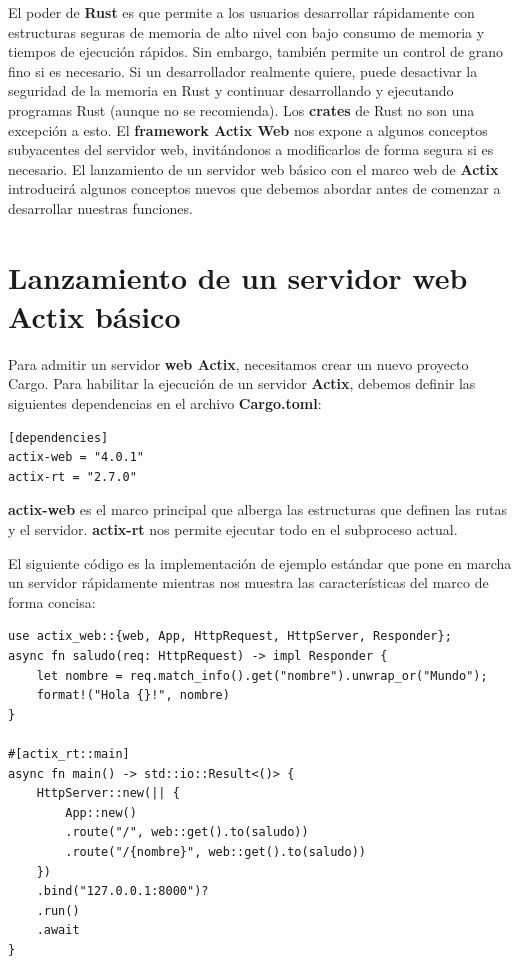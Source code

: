 El poder de \textbf{Rust} es que permite a los usuarios desarrollar rápidamente con estructuras seguras de memoria de alto nivel con bajo consumo de memoria y tiempos de ejecución rápidos. Sin embargo, también permite un control de grano fino si es necesario. Si un desarrollador realmente quiere, puede desactivar la seguridad de la memoria en Rust y continuar desarrollando y ejecutando programas Rust (aunque no se recomienda). Los \textbf{crates} de Rust no son una excepción a esto. El \textbf{framework Actix Web} nos expone a algunos conceptos subyacentes del servidor web, invitándonos a modificarlos de forma segura si es necesario. El lanzamiento de un servidor web básico con el marco web de \textbf{Actix} introducirá algunos conceptos nuevos que debemos abordar antes de comenzar a desarrollar nuestras funciones.

\section{Lanzamiento de un servidor web Actix básico}

Para admitir un servidor \textbf{web Actix}, necesitamos crear un nuevo proyecto Cargo. Para habilitar la ejecución de un servidor \textbf{Actix}, debemos definir las siguientes dependencias en el archivo \textbf{Cargo.toml}:


\begin{lstlisting}
[dependencies]
actix-web = "4.0.1"
actix-rt = "2.7.0"
\end{lstlisting}

\textbf{actix-web} es el marco principal que alberga las estructuras que definen las rutas y el servidor. \textbf{actix-rt} nos permite ejecutar todo en el subproceso actual.

El siguiente código es la implementación de ejemplo estándar que pone en marcha un servidor rápidamente mientras nos muestra las características del marco de forma concisa:

\begin{lstlisting}
use actix_web::{web, App, HttpRequest, HttpServer, Responder};
async fn saludo(req: HttpRequest) -> impl Responder {
	let nombre = req.match_info().get("nombre").unwrap_or("Mundo");
	format!("Hola {}!", nombre)
}

#[actix_rt::main]
async fn main() -> std::io::Result<()> {
	HttpServer::new(|| {
		App::new()
		.route("/", web::get().to(saludo))
		.route("/{nombre}", web::get().to(saludo))
	})
	.bind("127.0.0.1:8000")?
	.run()
	.await
}
\end{lstlisting}

